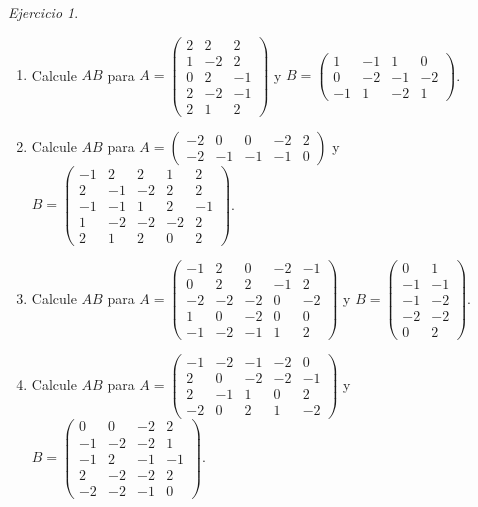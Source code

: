 \documentclass[12pt]{article}
\theoremstyle{remark}
\newtheorem{Ejer}[definicion]{Ejercicio}
\begin{document}
\begin{Ejer}
\begin{enumerate}[start=113]
\item Calcule $AB$ para $A=\begin{pmatrix}2&2&2\\1&-2&2\\0&2&-1\\2&-2&-1\\2&1&2\end{pmatrix}$ y $B=\begin{pmatrix}1&-1&1&0\\0&-2&-1&-2\\-1&1&-2&1\end{pmatrix}$.

\item Calcule $AB$ para $A=\begin{pmatrix}-2&0&0&-2&2\\-2&-1&-1&-1&0\end{pmatrix}$ y $B=\begin{pmatrix}-1&2&2&1&2\\2&-1&-2&2&2\\-1&-1&1&2&-1\\1&-2&-2&-2&2\\2&1&2&0&2\end{pmatrix}$.

\item Calcule $AB$ para $A=\begin{pmatrix}-1&2&0&-2&-1\\0&2&2&-1&2\\-2&-2&-2&0&-2\\1&0&-2&0&0\\-1&-2&-1&1&2\end{pmatrix}$ y $B=\begin{pmatrix}0&1\\-1&-1\\-1&-2\\-2&-2\\0&2\end{pmatrix}$.

\item Calcule $AB$ para $A=\begin{pmatrix}-1&-2&-1&-2&0\\2&0&-2&-2&-1\\2&-1&1&0&2\\-2&0&2&1&-2\end{pmatrix}$ y $B=\begin{pmatrix}0&0&-2&2\\-1&-2&-2&1\\-1&2&-1&-1\\2&-2&-2&2\\-2&-2&-1&0\end{pmatrix}$.
\end{enumerate}
\end{Ejer}
\end{document}
